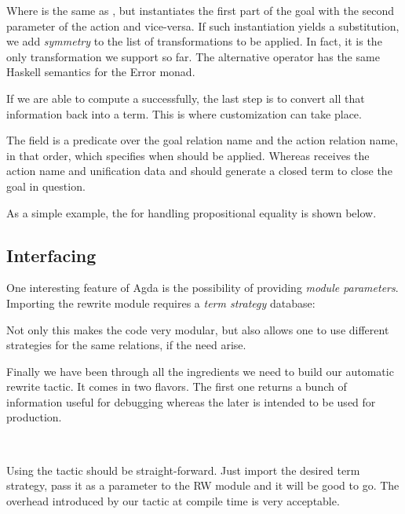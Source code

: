 
Where  is the same as , but instantiates the first part of the goal with the second parameter of the action and vice-versa. If such instantiation yields a substitution, we add \emph{symmetry} to the list of
transformations to be applied. In fact, it is the only transformation we support so far. The alternative operator has the same Haskell semantics for
the Error monad.

If we are able to compute a  successfully, the last step is to convert
all that information back into a term. This is where customization can take place.


The  field is a predicate over the goal relation name and the action relation name, in that order, which specifies when  should be applied.
Whereas  receives the action name and unification data and should generate a closed term to close the goal in question.

As a simple example, the  for handling propositional equality is shown below.


\subsection{Interfacing}

One interesting feature of Agda is the possibility of providing \emph{module parameters}. Importing the rewrite module requires a \emph{term strategy} database:


Not only this makes the code very modular, but also allows one to use different strategies for the same relations, if the need arise.

Finally we have been through all the ingredients we need to build our automatic rewrite tactic. It comes in two flavors. The first one
returns a bunch of information useful for debugging whereas the
later is intended to be used for production.

\\

Using the  tactic should be straight-forward. Just import the desired term strategy, pass it
as a parameter to the RW module and it will be good to go. The overhead introduced by our tactic
at compile time is very acceptable.

